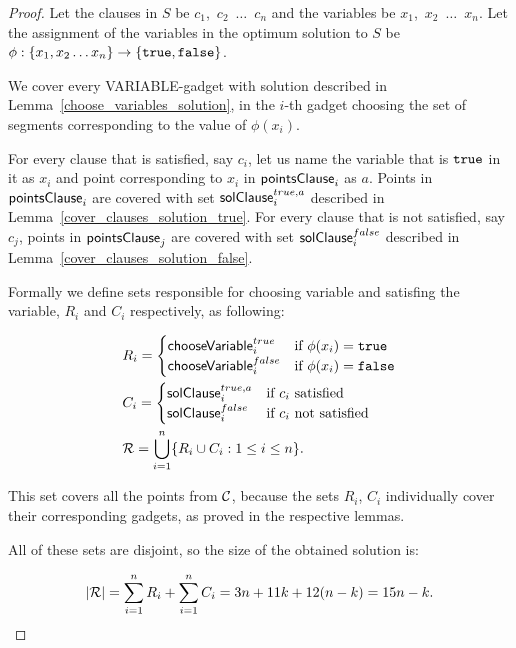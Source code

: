 \begin{proof}
Let the clauses in $S$ be $c_1$,~$c_2$~$\ldots$~$c_n$
and the variables be $x_1$,~$x_2$~$\ldots$~$x_n$.
Let the assignment of the variables in
the optimum solution to $S$ be
$\phi : \{ x_1, x_2 \ldots x_n\} \rightarrow \{\texttt{true}, \texttt{false}\}$.


We cover every VARIABLE-gadget with solution described in
Lemma~\ref{choose_variables_solution},
in the $i$-th gadget choosing the set of segments corresponding to the
value of $\phi(x_i)$.

For every clause that is satisfied, say $c_i$, 
let us name the variable that is $\texttt{true}$ in it as $x_i$
and point corresponding to $x_i$ in $\mathsf{pointsClause}_i$ as $a$.
Points in $\mathsf{pointsClause}_i$ 
are covered with set $\mathsf{solClause}^{true,a}_i$ described in
Lemma~\ref{cover_clauses_solution_true}.
For every clause that is not satisfied, say $c_j$,
points in $\mathsf{pointsClause}_j$ are covered
with set $\mathsf{solClause}^{false}_i$ described in
Lemma~\ref{cover_clauses_solution_false}.

Formally we define 
sets responsible for choosing variable and satisfing the variable,
$R_i$ and $C_i$ respectively, as following:

\begin{align}
	\begin{split}
	& R_i = \begin{cases}
		\mathsf{chooseVariable}^{true}_{i} & \text{if}\ \phi(x_i) = \texttt{true} \\
		\mathsf{chooseVariable}^{false}_{i} & \text{if}\ \phi(x_i) = \texttt{false} \\
		\end{cases} \\
	& C_i = \begin{cases}
		\mathsf{solClause}^{true,a}_i & \text{if}\ c_i \text{ satisfied} \\
		\mathsf{solClause}^{false}_i & \text{if}\ c_i \text{ not satisfied}
		\end{cases} \\
	& \mathcal{R} = \bigcup\limits_{i=1}^{n} \{R_i \cup C_i : 1 \le i \le n\}.
    \end{split}
\end{align}


This set covers all the points from $\mathcal{C}$, because
the sets $R_i$, $C_i$ individually cover their corresponding gadgets,
as proved in the respective lemmas.

All of these sets are disjoint, so the size of the obtained solution is:

$$|\mathcal{R}| = \sum_{i=1}^{n} R_i + \sum_{i=1}^n C_i = 3n + 11k + 12(n-k) = 15n - k.$$
\end{proof}


